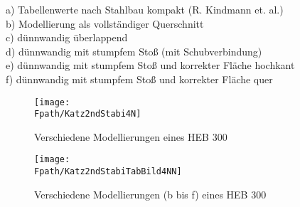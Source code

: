 \noindent\hspace*{4mm} a)	Tabellenwerte nach Stahlbau kompakt (R. Kindmann et. al.) \\
\noindent\hspace*{4mm} b)	Modellierung als vollst\"{a}ndiger Querschnitt \\
\noindent\hspace*{4mm} c)	d\"{u}nnwandig \"{u}berlappend\\
\noindent\hspace*{4mm} d)	d\"{u}nnwandig mit stumpfem Sto{\ss} (mit Schubverbindung)\\
\noindent\hspace*{4mm} e)	d\"{u}nnwandig mit stumpfem Sto{\ss} und korrekter Fl\"{a}che hochkant\\
\noindent\hspace*{4mm} f)	d\"{u}nnwandig mit stumpfem Sto{\ss} und korrekter Fl\"{a}che quer\\
\begin{figure}[tbp] \centering
\centering
\if {} \sidecaption[t] \fi
\texttt{[image: \\Fpath/Katz2ndStabi4N]}
\caption{Verschiedene Modellierungen eines HEB 300} \label{Katz2ndStabi4}
\end{figure}%

\begin{figure}[tbp] \centering
\centering
\if {} \sidecaption[t] \fi
\texttt{[image: \\Fpath/Katz2ndStabiTabBild4NN]}
\caption{Verschiedene Modellierungen (b bis f) eines HEB 300} \label{Katz2ndStabiTabBild4}
\end{figure}%

